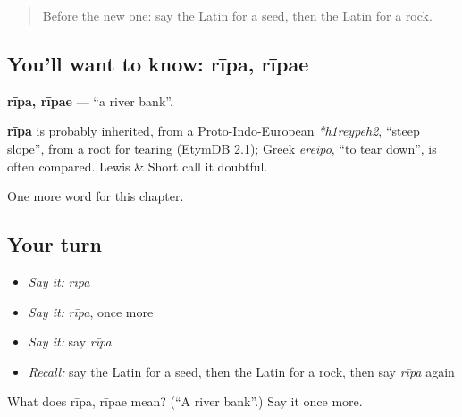 \label{lesson:LA-C129-ripa}



\begin{quote}
Before the new one: say the Latin for a seed, then the Latin for a rock.
\end{quote}

\subsection*{You'll want to know: rīpa, rīpae}
\textbf{rīpa, rīpae} — \textquotedblleft{}a river bank\textquotedblright{}.

\begin{cousinweb}
\textbf{rīpa} is probably inherited, from a Proto-Indo-European \emph{*h1reypeh2}, \textquotedblleft{}steep slope\textquotedblright{}, from a root for tearing (EtymDB 2.1); Greek \emph{ereipō}, \textquotedblleft{}to tear down\textquotedblright{}, is often compared. Lewis \& Short call it doubtful.
\end{cousinweb}

\begin{grammarlens}[title={What you've built}]
One more word for this chapter.
\end{grammarlens}

\subsection*{Your turn}
\begin{itemize}
\raggedright
  \item \emph{Say it:} \emph{rīpa}
  \item \emph{Say it:} \emph{rīpa}, once more
  \item \emph{Say it:} say \emph{rīpa}
  \item \emph{Recall:} say the Latin for a seed, then the Latin for a rock, then say \emph{rīpa} again
\end{itemize}

\begin{tcolorbox}[breakable,colback=teal!4,colframe=teal!35!black,title={Before you move on}]
What does rīpa, rīpae mean? (\textquotedblleft{}A river bank\textquotedblright{}.) Say it once more.
\end{tcolorbox}
